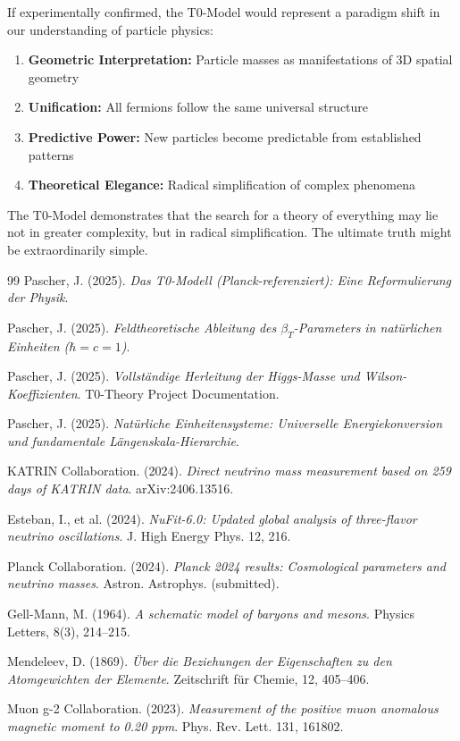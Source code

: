 	If experimentally confirmed, the T0-Model would represent a paradigm shift in our understanding of particle physics:
	
	\begin{enumerate}
		\item \textbf{Geometric Interpretation:} Particle masses as manifestations of 3D spatial geometry
		\item \textbf{Unification:} All fermions follow the same universal structure
		\item \textbf{Predictive Power:} New particles become predictable from established patterns
		\item \textbf{Theoretical Elegance:} Radical simplification of complex phenomena
	\end{enumerate}
	
	The T0-Model demonstrates that the search for a theory of everything may lie not in greater complexity, but in radical simplification. The ultimate truth might be extraordinarily simple.
	
	\begin{thebibliography}{99}
		Pascher, J. (2025). \textit{Das T0-Modell (Planck-referenziert): Eine Reformulierung der Physik}. 
		
		Pascher, J. (2025). \textit{Feldtheoretische Ableitung des $\beta_T$-Parameters in natürlichen Einheiten ($\hbar = c = 1$)}. 
		
		Pascher, J. (2025). \textit{Vollständige Herleitung der Higgs-Masse und Wilson-Koeffizienten}. T0-Theory Project Documentation.
		
		Pascher, J. (2025). \textit{Natürliche Einheitensysteme: Universelle Energiekonversion und fundamentale Längenskala-Hierarchie}. 
		
		KATRIN Collaboration. (2024). \textit{Direct neutrino mass measurement based on 259 days of KATRIN data}. arXiv:2406.13516.
		
		Esteban, I., et al. (2024). \textit{NuFit-6.0: Updated global analysis of three-flavor neutrino oscillations}. J. High Energy Phys. 12, 216.
		
		Planck Collaboration. (2024). \textit{Planck 2024 results: Cosmological parameters and neutrino masses}. Astron. Astrophys. (submitted).
		
		Gell-Mann, M. (1964). \textit{A schematic model of baryons and mesons}. Physics Letters, 8(3), 214--215.
		
		Mendeleev, D. (1869). \textit{Über die Beziehungen der Eigenschaften zu den Atomgewichten der Elemente}. Zeitschrift für Chemie, 12, 405--406.
		
		Muon g-2 Collaboration. (2023). \textit{Measurement of the positive muon anomalous magnetic moment to 0.20 ppm}. Phys. Rev. Lett. 131, 161802.
		
	\end{thebibliography}
